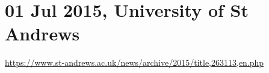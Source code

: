 \documentclass{deliverablereport}
\begin{document}

\clearpage

\section{01 Jul 2015, University of St Andrews}

{\scriptsize \url{https://www.st-andrews.ac.uk/news/archive/2015/title,263113,en.php}}

\medskip
\end{document}
